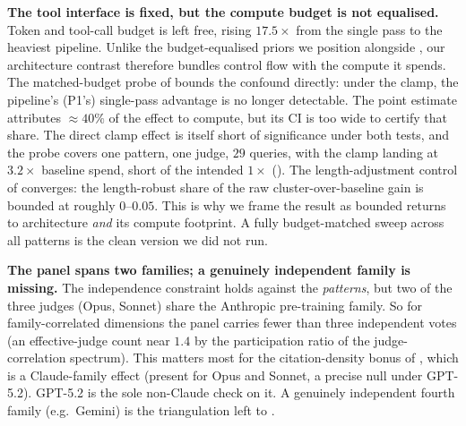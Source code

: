 \documentclass[11pt]{article}
\begin{document}
\textbf{The tool interface is fixed, but the compute budget is not equalised.} Token and tool-call
budget is left free, rising $17.5\times$ from the single pass to the heaviest pipeline.
Unlike the budget-equalised priors we position alongside \citep{scaling_agents2025,tran2026single}, our architecture contrast
therefore bundles control flow with the compute it spends. The matched-budget probe of
 bounds the confound directly: under the clamp, the
pipeline's (P1's) single-pass advantage is no longer detectable. The point estimate attributes
$\approx\!40\%$ of the effect to compute, but its CI is too wide to certify that share. The
direct clamp effect is itself short of significance under both tests, and the probe covers one
pattern, one judge, $29$ queries, with the clamp landing at $3.2\times$ baseline spend, short
of the intended $1\times$ (). The length-adjustment control of  converges: the length-robust share
of the raw cluster-over-baseline gain is bounded at roughly $0$--$0.05$. This is why we frame
the result as bounded returns to architecture \emph{and} its compute footprint. A fully
budget-matched sweep across all patterns is the clean version we did not run.

\textbf{The panel spans two families; a genuinely independent family is missing.} The
independence constraint holds against the \emph{patterns}, but two of the three judges
(Opus, Sonnet) share the Anthropic pre-training family. So for family-correlated
dimensions the panel carries fewer than three independent votes (an effective-judge count
near $1.4$ by the participation ratio of the judge-correlation spectrum). This matters most
for the citation-density bonus of , which is a Claude-family effect
(present for Opus and Sonnet, a precise null under GPT-5.2). GPT-5.2 is the sole non-Claude
check on it. A genuinely independent fourth family (e.g.\ Gemini) is the triangulation
left to .
\end{document}
